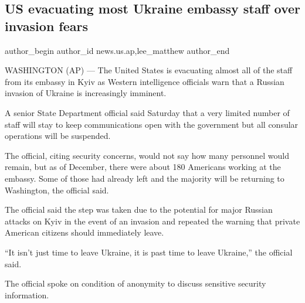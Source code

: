  
 
 
 
 
 
\subsection{US evacuating most Ukraine embassy staff over invasion fears}
\label{sec:12_02_2022.stz.news.us.ap.1.us_evacuation_ukraine}
 
\ifcmt
 author_begin
   author_id news.us.ap,lee_matthew
 author_end
\fi

WASHINGTON (AP) — The United States is evacuating almost all of the staff from
its embassy in Kyiv as Western intelligence officials warn that a Russian
invasion of Ukraine is increasingly imminent.


A senior State Department official said Saturday that a very limited number of
staff will stay to keep communications open with the government but all
consular operations will be suspended.

The official, citing security concerns, would not say how many personnel would
remain, but as of December, there were about 180 Americans working at the
embassy. Some of those had already left and the majority will be returning to
Washington, the official said.

The official said the step was taken due to the potential for major Russian
attacks on Kyiv in the event of an invasion and repeated the warning that
private American citizens should immediately leave.

\enquote{It isn't just time to leave Ukraine, it is past time to leave
Ukraine,} the official said.

The official spoke on condition of anonymity to discuss sensitive security
information.

